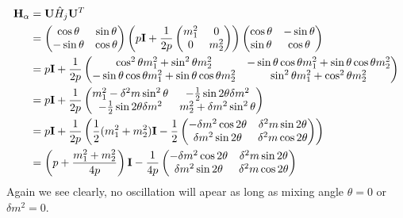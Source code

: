 \documentclass[letterpaper,12pt,english]{sphinxmanual}
\begin{document}
\begin{gather}
\begin{split}\mathbf H_{\alpha} & = \mathbf U \hat H_j  \mathbf U^T \\
& =  \begin{pmatrix}  \cos\theta & \sin\theta \\ -\sin\theta  & \cos\theta \end{pmatrix} \left( p \mathbf I + \frac{1}{2p}\begin{pmatrix} m_1^2 & 0 \\ 0 & m_2^2 \end{pmatrix} \right)   \begin{pmatrix}  \cos\theta & -\sin\theta \\ \sin\theta & \cos\theta \end{pmatrix} \\
& = p \mathbf I + \frac{1}{2p} \begin{pmatrix} \cos^2\theta m_1^2 + \sin^2\theta m_2^2 & -\sin\theta\cos\theta m_1^2 + \sin\theta\cos\theta m_2^2 \\ -\sin\theta\cos\theta m_1^2 + \sin\theta\cos\theta m_2^2 & \sin^2\theta m_1^2 + \cos^2\theta m_2^2 \end{pmatrix} \\
& = p \mathbf I + \frac{1}{2p} \begin{pmatrix} m_1^2 - \delta^2 m \sin^2\theta & -\frac{1}{2}\sin 2\theta  \delta m^2  \\ -\frac{1}{2}\sin 2\theta  \delta m^2  & m_2^2+ \delta m^2 \sin^2\theta \end{pmatrix} \\
& = p \mathbf I + \frac{1}{2p} \left( \frac{1}{2}(m_1^2+m_2^2) \mathbf I -   \frac{1}{2}\begin{pmatrix} - \delta m^2 \cos 2\theta & \delta^2 m \sin 2\theta \\  \delta m^2 \sin 2\theta & \delta^2 m\cos 2\theta \end{pmatrix} \right) \\
& = \left(p + \frac{m_1^2+m_2^2}{4p} \right)\mathbf I - \frac{1}{4p}\begin{pmatrix} - \delta m^2 \cos 2\theta & \delta^2 m \sin 2\theta \\  \delta m^2 \sin 2\theta & \delta^2 m\cos 2\theta \end{pmatrix}\end{split}\notag
\end{gather}
Again we see clearly, no oscillation will apear as long as mixing angle \(\theta=0\) or \(\delta m^2 =0\).
\end{document}

